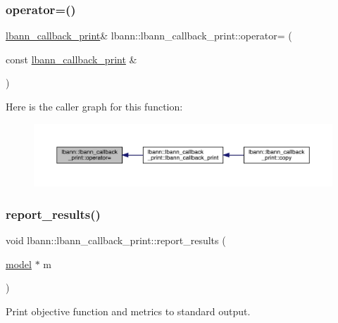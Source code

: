 \subsubsection{\texorpdfstring{operator=()}{operator=()}}
{\footnotesize\ttfamily \hyperlink{classlbann_1_1lbann__callback__print}{lbann\+\_\+callback\+\_\+print}\& lbann\+::lbann\+\_\+callback\+\_\+print\+::operator= (\begin{DoxyParamCaption}\item[{const \hyperlink{classlbann_1_1lbann__callback__print}{lbann\+\_\+callback\+\_\+print} \&}]{ }\end{DoxyParamCaption})\hspace{0.3cm}{\ttfamily [default]}}

Here is the caller graph for this function\+:\nopagebreak
\begin{figure}[H]
\begin{center}
\leavevmode
\includegraphics[width=350pt]{classlbann_1_1lbann__callback__print_a4924cd2aebecdca00dbc0ac9d71df666_icgraph}
\end{center}
\end{figure}
\mbox{\label{classlbann_1_1lbann__callback__print_a50117faa3edb961ddd87c5c5806820b2}} 
\subsubsection{\texorpdfstring{report\+\_\+results()}{report\_results()}}
{\footnotesize\ttfamily void lbann\+::lbann\+\_\+callback\+\_\+print\+::report\+\_\+results (\begin{DoxyParamCaption}\item[{\hyperlink{classlbann_1_1model}{model} $\ast$}]{m }\end{DoxyParamCaption})\hspace{0.3cm}{\ttfamily [private]}}

Print objective function and metrics to standard output. 

